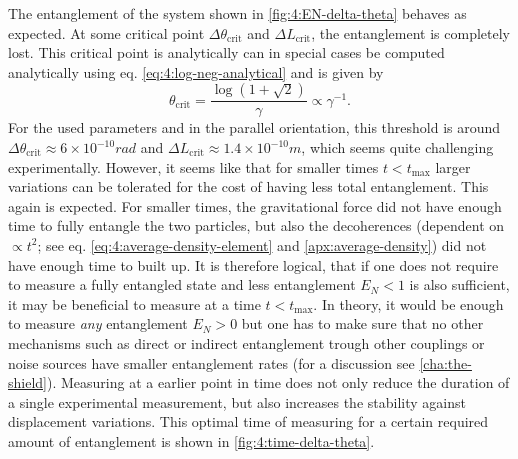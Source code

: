 The entanglement of the system shown in \cref{fig:4:EN-delta-theta} behaves as expected. At some critical point $\Delta \theta_\mathrm{crit}$ and $\Delta L_\mathrm{crit}$, the entanglement is completely lost.
This critical point is analytically can in special cases be computed analytically using eq. \eqref{eq:4:log-neg-analytical} and is given by
\begin{equation}\label{eq:4:theta-crit-analytical}
  \theta_\mathrm{crit} = \frac{\log(1 + \sqrt{2})}{\gamma} \propto \gamma^{-1} .
\end{equation}
For the used parameters and in the parallel orientation, this threshold is around $\Delta \theta_\mathrm{crit} \approx 6 \times 10^{-10} \si{rad}$ and $\Delta L_\mathrm{crit} \approx 1.4 \times 10^{-10} \si{m}$, which seems quite challenging experimentally.
However, it seems like that for smaller times $t<t_\mathrm{max}$ larger variations can be tolerated for the cost of having less total entanglement.
This again is expected. For smaller times, the gravitational force did not have enough time to fully entangle the two particles, but also the decoherences (dependent on $\propto t^2$; see eq. \eqref{eq:4:average-density-element} and \cref{apx:average-density}) did not have enough time to built up. 
It is therefore logical, that if one does not require to measure a fully entangled state and less entanglement $E_N < 1$ is also sufficient, it may be beneficial to measure at a time $t < t_\mathrm{max}$. In theory, it would be enough to measure \textit{any} entanglement $E_N > 0$ but one has to make sure that no other mechanisms such as direct or indirect entanglement trough other couplings or noise sources have smaller entanglement rates (for a discussion see \cref{cha:the-shield}). 
Measuring at a earlier point in time does not only reduce the duration of a single experimental measurement, but also increases the stability against displacement variations. This optimal time of measuring for a certain required amount of entanglement is shown in \cref{fig:4:time-delta-theta}.
